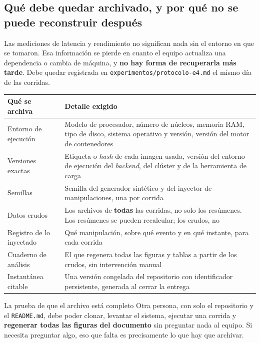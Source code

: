 \documentclass[11pt,a4paper]{article}
\begin{document}
\subsection{Qué debe quedar archivado, y por qué no se puede reconstruir después}

Las mediciones de latencia y rendimiento no significan nada sin el entorno en que se tomaron. Esa información se pierde en cuanto el equipo actualiza una dependencia o cambia de máquina, y \textbf{no hay forma de recuperarla más tarde}. Debe quedar registrada en \texttt{experimentos/protocolo-e4.md} el mismo día de las corridas.

\begin{center}
	\small
	\begin{tabular}{@{}p{4.4cm}p{10.5cm}@{}}
		\toprule
		\textbf{Qué se archiva} & \textbf{Detalle exigido} \\
		\midrule
		Entorno de ejecución & Modelo de procesador, número de núcleos, memoria RAM, tipo de disco, sistema operativo y versión, versión del motor de contenedores \\
		\addlinespace
		Versiones exactas & Etiqueta o \emph{hash} de cada imagen usada, versión del entorno de ejecución del \emph{backend}, del clúster y de la herramienta de carga \\
		\addlinespace
		Semillas & Semilla del generador sintético y del inyector de manipulaciones, una por corrida \\
		\addlinespace
		Datos crudos & Los archivos de \textbf{todas} las corridas, no solo los resúmenes. Los resúmenes se pueden recalcular; los crudos, no \\
		\addlinespace
		Registro de lo inyectado & Qué manipulación, sobre qué evento y en qué instante, para cada corrida \\
		\addlinespace
		Cuaderno de análisis & El que regenera todas las figuras y tablas a partir de los crudos, sin intervención manual \\
		\addlinespace
		Instantánea citable & Una versión congelada del repositorio con identificador persistente, generada al cerrar la entrega \\
		\bottomrule
	\end{tabular}
\end{center}

\begin{defBox}{La prueba de que el archivo está completo}
	Otra persona, con solo el repositorio y el \texttt{README.md}, debe poder clonar, levantar el sistema, ejecutar una corrida y \textbf{regenerar todas las figuras del documento} sin preguntar nada al equipo. Si necesita preguntar algo, eso que falta es precisamente lo que hay que archivar.
\end{defBox}
\end{document}
